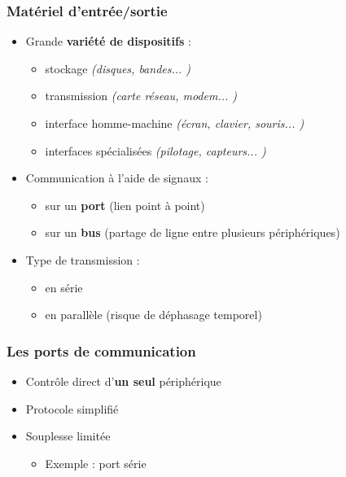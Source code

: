 \begin{frame}
\frametitle{Matériel d'entrée/sortie}
\begin{itemize}
\item Grande \textbf{variété de dispositifs} :
\begin{itemize}
\item stockage \textit{(disques, bandes... )}
\item transmission \textit{(carte réseau, modem... )}
\item interface homme-machine \textit{(écran, clavier, souris... )}
\item interfaces spécialisées \textit{(pilotage, capteurs... )}
\end{itemize}
\item Communication à l'aide de signaux :
\begin{itemize}
\item sur un \textbf{port} (lien point à point)
\item sur un \textbf{bus} (partage de ligne entre plusieurs périphériques)
\end{itemize}
\item Type de transmission :
\begin{itemize}
\item en série
\item en parallèle (risque de déphasage temporel)
\end{itemize}
\end{itemize}
\end{frame}

\begin{frame}
\frametitle{Les ports de communication}
\begin{itemize}
\item Contrôle direct d'\textbf{un seul} périphérique
\item Protocole simplifié
\item Souplesse limitée
\begin{itemize}
\item Exemple : port série
\end{itemize}
\end{itemize}
\end{frame}

